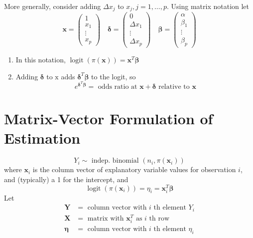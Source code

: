 \documentclass[11pt]{elegantbook}
\begin{document}
More generally, consider adding $\Delta x_j$ to $x_j, j=1, \ldots, p$. Using matrix notation let
$$
\mathbf{x}=\left(\begin{array}{c}
1 \\
x_1 \\
\vdots \\
x_p
\end{array}\right) \quad \boldsymbol{\delta}=\left(\begin{array}{c}
0 \\
\Delta x_1 \\
\vdots \\
\Delta x_p
\end{array}\right) \quad \boldsymbol{\beta}=\left(\begin{array}{c}
\alpha \\
\beta_1 \\
\vdots \\
\beta_p
\end{array}\right)
$$
\begin{enumerate}[$\bullet$]
    \item In this notation, $\operatorname{logit}(\pi(\mathbf{x}))=\mathbf{x}^T \boldsymbol{\beta}$
    \item Adding $\boldsymbol{\delta}$ to $\mathrm{x}$ adds $\boldsymbol{\delta}^T \boldsymbol{\beta}$ to the logit, so
    $$
    e^{\boldsymbol{\delta}^T \boldsymbol{\beta}}=\text { odds ratio at } \mathbf{x}+\boldsymbol{\delta} \text { relative to } \mathbf{x}
    $$
\end{enumerate}

\section{Matrix-Vector Formulation of Estimation}
$$
Y_i \sim \text { indep. binomial }\left(n_i, \pi\left(\boldsymbol{x}_i\right)\right)
$$
where $\boldsymbol{x}_i$ is the column vector of explanatory variable values for observation $i$, and (typically) a 1 for the intercept, and
$$
\operatorname{logit}\left(\pi\left(\boldsymbol{x}_i\right)\right)=\eta_i=\boldsymbol{x}_i^T \boldsymbol{\beta}
$$
Let
$$
\begin{aligned}
\boldsymbol{Y} & =\text { column vector with } i \text { th element } Y_i \\
\boldsymbol{X} & =\text { matrix with } \boldsymbol{x}_i^T \text { as } i \text { th row } \\
\boldsymbol{\eta} & =\text { column vector with } i \text { th element } \eta_i
\end{aligned}
$$
\end{document}
